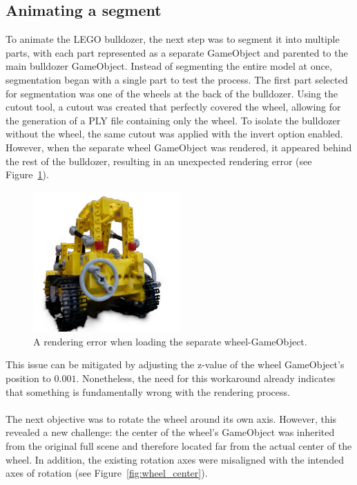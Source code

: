 \documentclass[12pt]{article}
\begin{document}
\subsection{Animating a segment}
To animate the LEGO bulldozer, the next step was to segment it into multiple parts, with each part represented as a separate GameObject and parented to the main bulldozer GameObject. Instead of segmenting the entire model at once, segmentation began with a single part to test the process. The first part selected for segmentation was one of the wheels at the back of the bulldozer. Using the cutout tool, a cutout was created that perfectly covered the wheel, allowing for the generation of a PLY file containing only the wheel. To isolate the bulldozer without the wheel, the same cutout was applied with the invert option enabled. However, when the separate wheel GameObject was rendered, it appeared behind the rest of the bulldozer, resulting in an unexpected rendering error (see Figure~\ref{fig:firstwheel}).
\begin{figure}[h!]
	\centering
	\includegraphics[width=0.5\textwidth]{Images/first_wheel.png}
	\caption{A rendering error when loading the separate wheel-GameObject.}
	\label{fig:firstwheel}
\end{figure}
\FloatBarrier
\noindent
This issue can be mitigated by adjusting the z-value of the wheel GameObject’s position to $0.001$. Nonetheless, the need for this workaround already indicates that something is fundamentally wrong with the rendering process.
\\\\
The next objective was to rotate the wheel around its own axis. However, this revealed a new challenge: the center of the wheel’s GameObject was inherited from the original full scene and therefore located far from the actual center of the wheel. In addition, the existing rotation axes were misaligned with the intended axes of rotation (see Figure~\ref{fig:wheel_center}).
\end{document}
